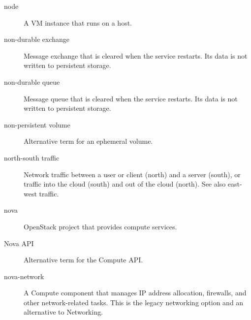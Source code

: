 \documentclass[letterpaper,10pt,english]{sphinxmanual}
\begin{document}
\begin{description}
\item[{node}] \leavevmode{}\label{_source/glossary:term-node}
A VM instance that runs on a host.

\item[{non-durable exchange}] \leavevmode{}\label{_source/glossary:term-non-durable-exchange}
Message exchange that is cleared when the service restarts. Its
data is not written to persistent storage.

\item[{non-durable queue}] \leavevmode{}\label{_source/glossary:term-non-durable-queue}
Message queue that is cleared when the service restarts. Its
data is not written to persistent storage.

\item[{non-persistent volume}] \leavevmode{}\label{_source/glossary:term-non-persistent-volume}
Alternative term for an ephemeral volume.

\item[{north-south traffic}] \leavevmode{}\label{_source/glossary:term-north-south-traffic}
Network traffic between a user or client (north) and a
server (south), or traffic into the cloud (south) and
out of the cloud (north). See also east-west traffic.

\item[{nova}] \leavevmode{}\label{_source/glossary:term-nova}
OpenStack project that provides compute services.

\item[{Nova API}] \leavevmode{}\label{_source/glossary:term-nova-api}
Alternative term for the Compute API.

\item[{nova-network}] \leavevmode{}\label{_source/glossary:term-nova-network}
A Compute component that manages IP address allocation,
firewalls, and other network-related tasks. This is the legacy
networking option and an alternative to Networking.

\end{description}
\end{document}
